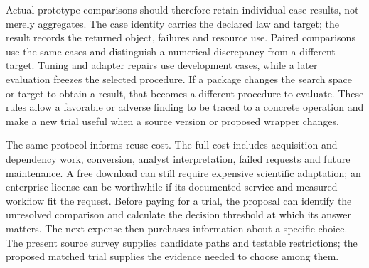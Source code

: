 Actual prototype comparisons should therefore retain individual case results,
not merely aggregates. The case identity carries the declared law and target;
the result records the returned object, failures and resource use. Paired
comparisons use the same cases and distinguish a numerical discrepancy from
a different target. Tuning and adapter repairs use development cases, while
a later evaluation freezes the selected procedure. If a package changes the
search space or target to obtain a result, that becomes a different procedure
to evaluate. These rules allow a favorable or adverse finding to be traced
to a concrete operation and make a new trial useful when a source version
or proposed wrapper changes.

The same protocol informs reuse cost. The full cost includes acquisition and
dependency work, conversion, analyst interpretation, failed requests and
future maintenance. A free download can still require expensive scientific
adaptation; an enterprise license can be worthwhile if its documented service
and measured workflow fit the request. Before paying for a trial, the proposal
can identify the unresolved comparison and calculate the decision threshold
at which its answer matters. The next expense then purchases information
about a specific choice. The present source survey supplies candidate paths
and testable restrictions; the proposed matched trial supplies the evidence
needed to choose among them.
\label{exec13:survey-reviewed-end}

